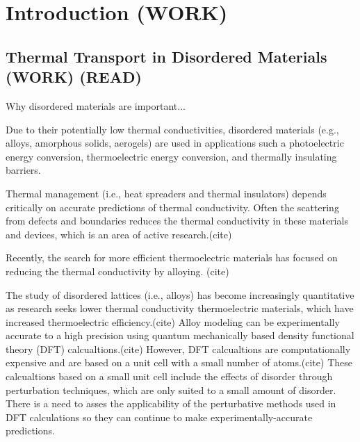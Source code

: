 \chapter{Introduction (WORK)}

\section{Thermal Transport in Disordered Materials (WORK) (READ)}

Why disordered materials are important...

Due to their potentially low thermal conductivities, 
disordered materials (e.g., alloys, amorphous solids, aerogels) 
are used in 
applications such a photoelectric energy conversion, 
thermoelectric energy conversion, and thermally insulating barriers.
\cite{graebner_phonon_1986,cahill_lattice_1988,lu_thermal_1992,
chen_recent_2003,clarke_thermal_2005,snyder_complex_2008,
minnich_bulk_2009,toberer_phonon_2011,zebarjadi_perspectives_2012,
schiffres_gas_2012,duda_exceptionally_2013}

Thermal management (i.e., heat spreaders and thermal insulators) 
depends critically on accurate predictions of thermal conductivity. 
Often the scattering from defects and boundaries reduces the thermal 
conductivity in these materials and devices, which is an area of 
active research.(cite) 

Recently, the search for more efficient thermoelectric 
materials has focused on reducing the thermal conductivity by alloying.
(cite)

The study of disordered lattices (i.e., alloys) has become increasingly 
quantitative as research seeks lower thermal conductivity 
thermoelectric materials, which have increased thermoelectric 
efficiency.(cite) Alloy modeling can be experimentally accurate 
to a high precision using quantum mechanically based density 
functional theory (DFT) calcualtions.(cite) However, DFT calcualtions 
are computationally expensive and are based on a unit cell 
with a small number of atoms.(cite) These calcualtions based on 
a small unit cell include the effects of disorder through 
perturbation techniques, which are only suited to a small amount of 
disorder. There is a need to asses the applicability of the perturbative 
methods used in DFT calculations so they can continue to make 
experimentally-accurate predictions. 

